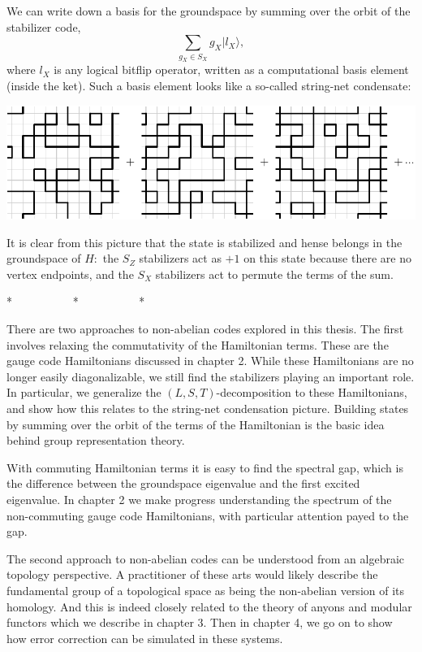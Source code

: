 \documentclass[11pt,twoside,openright]{report}
\newcommand{\ket}[1]{|{#1}\rangle}
\begin{document}
We can write down a basis for the groundspace by summing over
the orbit of the stabilizer code,
$$
    \sum_{g_X\in S_X} g_X \ket{l_X},
$$
where $l_X$ is any logical bitflip operator, written as a computational
basis element (inside the ket).
Such a basis element looks like a so-called string-net condensate:
\begin{center}
\includegraphics[width=0.8\columnwidth]{pic-toric-liquid.pdf}
\end{center}
It is clear from this picture that the state is stabilized and
hense belongs in the groundspace of $H:$ 
the $S_Z$ stabilizers act as $+1$ on this state because there
are no vertex endpoints, and the $S_X$ stabilizers act to permute
the terms of the sum.


\begin{center}
* \ \ \ \ \ \ \ \ \ \ * \ \ \ \ \ \ \ \ \ \ *
\end{center}

There are two approaches to non-abelian codes
explored in this thesis.
The first involves relaxing the commutativity
of the Hamiltonian terms.
These are the gauge code Hamiltonians discussed in chapter 2.
While these Hamiltonians are no longer easily diagonalizable,
we still find the stabilizers playing an important role.
In particular, we generalize the $(L,S,T)$-decomposition to these
Hamiltonians, and show how this relates to the string-net condensation picture.
Building states by summing over the orbit of the terms of the
Hamiltonian is the basic idea behind group representation theory.

With commuting Hamiltonian terms it is easy to find the spectral gap,
which is the difference between the groundspace eigenvalue and the
first excited eigenvalue.
In chapter 2 
we make progress understanding the spectrum of
the non-commuting gauge code Hamiltonians, 
with particular attention payed
to the gap.

The second approach to non-abelian codes can be understood 
from an algebraic topology perspective. 
A practitioner of these arts would likely describe
the fundamental group of a topological space as being the non-abelian 
version of its homology.
And this is indeed closely related to 
the theory of anyons and modular
functors which we describe in chapter 3.
Then in chapter 4, we go on to show how
error correction can be simulated in these systems.
\end{document}

